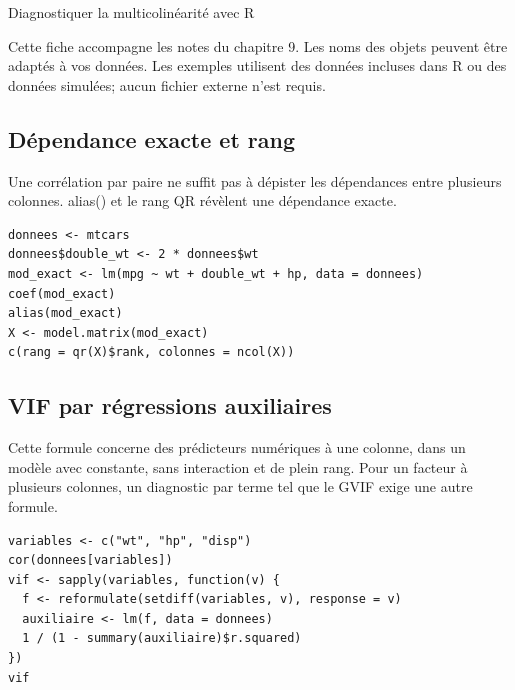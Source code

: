\documentclass[letterpaper,11pt]{article}
\begin{document}
\begin{center}{\Large Diagnostiquer la multicolinéarité avec R}\end{center}
Cette fiche accompagne les notes du chapitre 9. Les noms des objets peuvent être adaptés à vos données. Les exemples utilisent des données incluses dans R ou des données simulées; aucun fichier externe n’est requis.

\par\medskip\noindent\begin{minipage}{\linewidth}
\subsection*{Dépendance exacte et rang}
Une corrélation par paire ne suffit pas à dépister les dépendances entre plusieurs colonnes. alias() et le rang QR révèlent une dépendance exacte.
\begin{Verbatim}
donnees <- mtcars
donnees$double_wt <- 2 * donnees$wt
mod_exact <- lm(mpg ~ wt + double_wt + hp, data = donnees)
coef(mod_exact)
alias(mod_exact)
X <- model.matrix(mod_exact)
c(rang = qr(X)$rank, colonnes = ncol(X))
\end{Verbatim}

\end{minipage}\par
\par\medskip\noindent\begin{minipage}{\linewidth}
\subsection*{VIF par régressions auxiliaires}
Cette formule concerne des prédicteurs numériques à une colonne, dans un modèle avec constante, sans interaction et de plein rang. Pour un facteur à plusieurs colonnes, un diagnostic par terme tel que le GVIF exige une autre formule.
\begin{Verbatim}
variables <- c("wt", "hp", "disp")
cor(donnees[variables])
vif <- sapply(variables, function(v) {
  f <- reformulate(setdiff(variables, v), response = v)
  auxiliaire <- lm(f, data = donnees)
  1 / (1 - summary(auxiliaire)$r.squared)
})
vif
\end{Verbatim}

\end{minipage}\par
\end{document}

